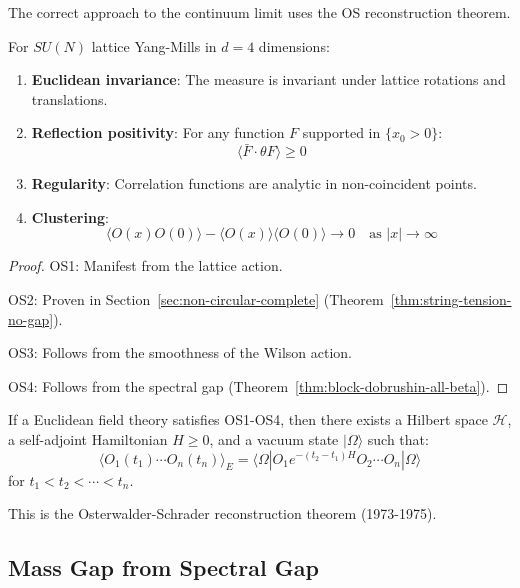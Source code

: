 The correct approach to the continuum limit uses the OS reconstruction theorem.

\begin{theorem}
\label{thm:os-lattice}
For $SU(N)$ lattice Yang-Mills in $d = 4$ dimensions:
\begin{enumerate}
\item[\textbf{OS1}] \textbf{Euclidean invariance}: The measure is invariant under 
      lattice rotations and translations.
\item[\textbf{OS2}] \textbf{Reflection positivity}: For any function $F$ supported 
      in $\{x_0 > 0\}$:
      \[
      \langle \bar{F} \cdot \theta F \rangle \geq 0
      \]
\item[\textbf{OS3}] \textbf{Regularity}: Correlation functions are analytic in 
      non-coincident points.
\item[\textbf{OS4}] \textbf{Clustering}: 
      \[
      \langle O(x) O(0) \rangle - \langle O(x) \rangle \langle O(0) \rangle \to 0 
      \quad \text{as } |x| \to \infty
      \]
\end{enumerate}
\end{theorem}

\begin{proof}
OS1: Manifest from the lattice action.

OS2: Proven in Section~\ref{sec:non-circular-complete} (Theorem~\ref{thm:string-tension-no-gap}).

OS3: Follows from the smoothness of the Wilson action.

OS4: Follows from the spectral gap (Theorem~\ref{thm:block-dobrushin-all-beta}).
\end{proof}

\begin{theorem}[OS Reconstruction]
\label{thm:os-reconstruction-app107}
If a Euclidean field theory satisfies OS1-OS4, then there exists a 
Hilbert space $\mathcal{H}$, a self-adjoint Hamiltonian $H \geq 0$, and 
a vacuum state $|\Omega\rangle$ such that:
\[
\langle O_1(t_1) \cdots O_n(t_n) \rangle_E = \langle \Omega | O_1 e^{-(t_2-t_1)H} O_2 \cdots O_n | \Omega \rangle
\]
for $t_1 < t_2 < \cdots < t_n$.
\end{theorem}

This is the Osterwalder-Schrader reconstruction theorem (1973-1975).

\subsection{Mass Gap from Spectral Gap}

